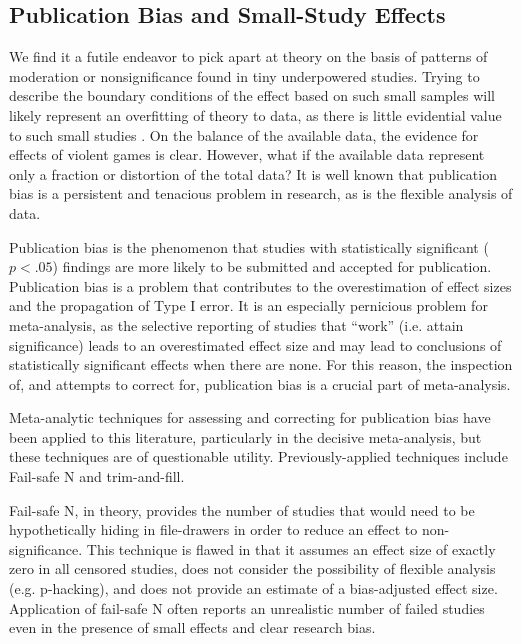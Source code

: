 \documentclass[man]{apa6}
\begin{document}
\subsection{Publication Bias and Small-Study Effects}
We find it a futile endeavor to pick apart at theory on the basis of patterns of moderation or nonsignificance found in tiny underpowered studies. Trying to describe the boundary conditions of the effect based on such small samples will likely represent an overfitting of theory to data, as there is little evidential value to such small studies \citep{Hilgard:etal:2014}.
On the balance of the available data, the evidence for effects of violent games is clear.
However, what if the available data represent only a fraction or distortion of the total data? 
It is well known that publication bias is a persistent and tenacious problem in research, as is the flexible analysis of data.

Publication bias is the phenomenon that studies with statistically significant ($p<.05$) findings are more likely to be submitted and accepted for publication. Publication bias is a problem that contributes to the overestimation of effect sizes and the propagation of Type I error. It is an especially pernicious problem for meta-analysis, as the selective reporting of studies that ``work'' (i.e. attain significance) leads to an overestimated effect size and may lead to conclusions of statistically significant effects when there are none. For this reason, the inspection of, and attempts to correct for, publication bias is a crucial part of meta-analysis.

Meta-analytic techniques for assessing and correcting for publication bias have been applied to this literature, particularly in the decisive \citet{Anderson:etal:2010} meta-analysis, but these techniques are of questionable utility. Previously-applied techniques include Fail-safe N and trim-and-fill.

Fail-safe N, in theory, provides the number of studies %
that would need to be hypothetically hiding in file-drawers in order to reduce an effect to non-significance. This technique is flawed in that it assumes an effect size of exactly zero in all censored studies, does not consider the possibility of flexible analysis (e.g. p-hacking), and does not provide an estimate of a bias-adjusted effect size. Application of fail-safe N often reports an unrealistic number of failed studies even in the presence of small effects and clear research bias. %
\end{document}
